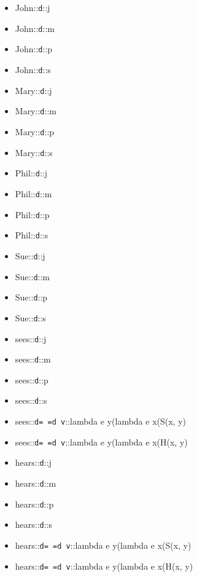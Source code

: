 \documentclass[aspectratio=169]{beamer}
\newcommand{\lex}[3]{{#1}::{\texttt{#2}}::{#3}}
\begin{document}
\begin{frame}

\begin{tiny}
\begin{multicols}{3}
\begin{itemize}
  \item \lex{John}{d}{j}
  \item \lex{John}{d}{m}
  \item \lex{John}{d}{p}
  \item \lex{John}{d}{s}

  \item \lex{Mary}{d}{j}
  \item \lex{Mary}{d}{m}
  \item \lex{Mary}{d}{p}
  \item \lex{Mary}{d}{s}

  \item \lex{Phil}{d}{j}
  \item \lex{Phil}{d}{m}
  \item \lex{Phil}{d}{p}
  \item \lex{Phil}{d}{s}

  \item \lex{Sue}{d}{j}
  \item \lex{Sue}{d}{m}
  \item \lex{Sue}{d}{p}
  \item \lex{Sue}{d}{s}


  \item \lex{sees}{d}{j}
  \item \lex{sees}{d}{m}
  \item \lex{sees}{d}{p}
  \item \lex{sees}{d}{s}
  \item \lex{sees}{d=~=d~v}{lambda e y(lambda e x(S(x, y)}
  \item \lex{sees}{d=~=d~v}{lambda e y(lambda e x(H(x, y)}

  \item \lex{hears}{d}{j}
  \item \lex{hears}{d}{m}
  \item \lex{hears}{d}{p}
  \item \lex{hears}{d}{s}
  \item \lex{hears}{d=~=d~v}{lambda e y(lambda e x(S(x, y)}
  \item \lex{hears}{d=~=d~v}{lambda e y(lambda e x(H(x, y)}


\end{itemize}
\end{multicols}
\end{tiny}
\end{frame}
\end{document}
